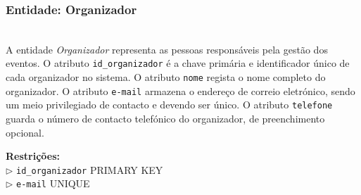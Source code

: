 \documentclass[runningheads]{llncs}
\begin{document}
                    \noindent\begin{minipage}{\textwidth}
                    \subsubsection{Entidade: Organizador}\mbox{}\\

                    A entidade \textit{Organizador} representa as pessoas responsáveis pela gestão dos eventos. 
                    O atributo \texttt{id\_organizador} é a chave primária e identificador único de cada 
                    organizador no sistema. O atributo \texttt{nome} regista o nome completo do organizador. 
                    O atributo \texttt{e-mail} armazena o endereço de correio eletrónico, sendo um meio 
                    privilegiado de contacto e devendo ser único. O atributo \texttt{telefone} guarda o número 
                    de contacto telefónico do organizador, de preenchimento opcional.

                    \begin{table}[H]
                    \centering
                    \renewcommand{\arraystretch}{1.5}
                    \vspace{0.2cm}
                    \caption{Atributos da entidade Organizador}
                    \label{tab:organizador}
                    \end{table}
                    \vspace{0.1cm}
                    \noindent\textbf{Restrições:}\\
                    \indent $\triangleright$ \texttt{id\_organizador} PRIMARY KEY\\
                    \indent $\triangleright$ \texttt{e-mail} UNIQUE
                    \end{minipage}
                    \vspace{0.4cm}
\end{document}
